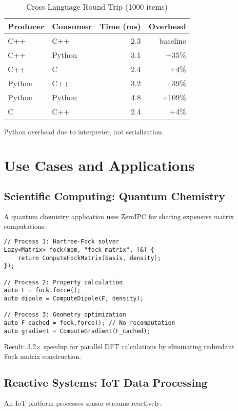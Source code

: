 \documentclass[letterpaper,twocolumn,10pt]{article}
\newcommand{\projectname}{ZeroIPC}
\begin{document}
\begin{table}[h]
\centering
\caption{Cross-Language Round-Trip (1000 items)}
\label{tab:interop}
\begin{tabular}{llrr}
\toprule
Producer & Consumer & Time (ms) & Overhead \\
\midrule
C++ & C++ & 2.3 & baseline \\
C++ & Python & 3.1 & +35\% \\
C++ & C & 2.4 & +4\% \\
Python & C++ & 3.2 & +39\% \\
Python & Python & 4.8 & +109\% \\
C & C++ & 2.4 & +4\% \\
\bottomrule
\end{tabular}
\end{table}

Python overhead due to interpreter, not serialization.

\section{Use Cases and Applications}

\subsection{Scientific Computing: Quantum Chemistry}

A quantum chemistry application uses \projectname{} for sharing expensive matrix computations:

\begin{lstlisting}
// Process 1: Hartree-Fock solver
Lazy<Matrix> fock(mem, "fock_matrix", [&] {
    return ComputeFockMatrix(basis, density);
});

// Process 2: Property calculation
auto F = fock.force();
auto dipole = ComputeDipole(F, density);

// Process 3: Geometry optimization
auto F_cached = fock.force(); // No recomputation
auto gradient = ComputeGradient(F_cached);
\end{lstlisting}

Result: 3.2× speedup for parallel DFT calculations by eliminating redundant Fock matrix construction.

\subsection{Reactive Systems: IoT Data Processing}

An IoT platform processes sensor streams reactively:
\end{document}
